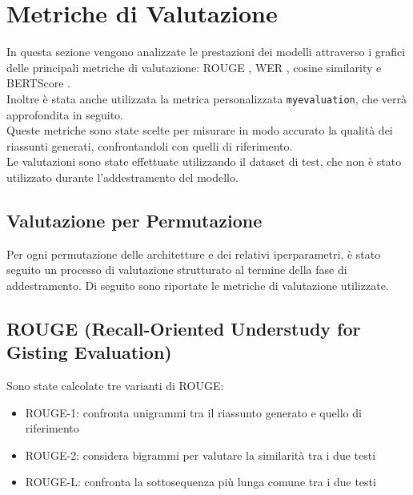 \section{Metriche di Valutazione}
In questa sezione vengono analizzate le prestazioni dei modelli attraverso i grafici delle principali metriche di valutazione: ROUGE \cite{lin-2004-rouge}, WER \cite{roy2021semanticwerunifiedmetricevaluation}, cosine similarity e BERTScore \cite{zhang2020bertscoreevaluatingtextgeneration}.\\
Inoltre è stata anche utilizzata la metrica personalizzata \texttt{myevaluation}, che verrà approfondita in seguito.\\
Queste metriche sono state scelte per misurare in modo accurato la qualit\`a dei riassunti generati, confrontandoli con quelli di riferimento.\\
Le valutazioni sono state effettuate utilizzando il dataset di test, che non \`e stato utilizzato durante l'addestramento del modello.\\

\subsection{Valutazione per Permutazione}
Per ogni permutazione delle architetture e dei relativi iperparametri,
è stato seguito un processo di valutazione strutturato al termine della
fase di addestramento. Di seguito sono riportate le metriche di valutazione utilizzate.

\subsection{ROUGE (Recall-Oriented Understudy for Gisting Evaluation)}
Sono state calcolate tre varianti di ROUGE:
\begin{itemize}
    \item ROUGE-1: confronta unigrammi tra il riassunto generato e quello di riferimento
    \item ROUGE-2: considera bigrammi per valutare la similarit\`a tra i due testi
    \item ROUGE-L: confronta la sottosequenza pi\`u lunga comune tra i due testi
\end{itemize}

